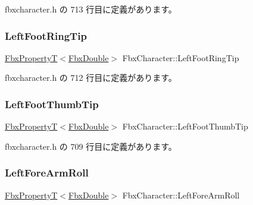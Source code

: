  fbxcharacter.\+h の 713 行目に定義があります。

\mbox{\label{class_fbx_character_a713205fb2db938b34a01b78bed306bf0}} 
\subsubsection{\texorpdfstring{Left\+Foot\+Ring\+Tip}{LeftFootRingTip}}
{\footnotesize\ttfamily \hyperlink{class_fbx_property_t}{Fbx\+PropertyT}$<$\hyperlink{fbxtypes_8h_a171e72a1c46fc15c1a6c9c31948c1c5b}{Fbx\+Double}$>$ Fbx\+Character\+::\+Left\+Foot\+Ring\+Tip}



 fbxcharacter.\+h の 712 行目に定義があります。

\mbox{\label{class_fbx_character_ad56eeb80f6f586d1c4f209b9269a8974}} 
\subsubsection{\texorpdfstring{Left\+Foot\+Thumb\+Tip}{LeftFootThumbTip}}
{\footnotesize\ttfamily \hyperlink{class_fbx_property_t}{Fbx\+PropertyT}$<$\hyperlink{fbxtypes_8h_a171e72a1c46fc15c1a6c9c31948c1c5b}{Fbx\+Double}$>$ Fbx\+Character\+::\+Left\+Foot\+Thumb\+Tip}



 fbxcharacter.\+h の 709 行目に定義があります。

\mbox{\label{class_fbx_character_a1b8acf0b566e44d7bde3ed046970a013}} 
\subsubsection{\texorpdfstring{Left\+Fore\+Arm\+Roll}{LeftForeArmRoll}}
{\footnotesize\ttfamily \hyperlink{class_fbx_property_t}{Fbx\+PropertyT}$<$\hyperlink{fbxtypes_8h_a171e72a1c46fc15c1a6c9c31948c1c5b}{Fbx\+Double}$>$ Fbx\+Character\+::\+Left\+Fore\+Arm\+Roll}



